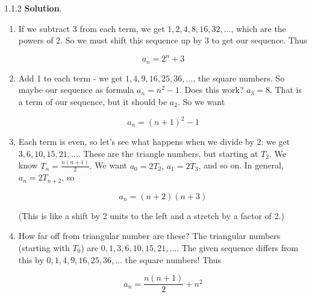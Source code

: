 \documentclass[11pt,]{book}
\theoremstyle{ptxplainnotitle}
\theoremstyle{ptxplaintitle}
\theoremstyle{ptxdefinitionnotitle}
\theoremstyle{ptxdefinitiontitle}
\theoremstyle{ptxdefinitionnotitle}
\theoremstyle{ptxdefinitiontitle}
\theoremstyle{ptxdefinitionnotitle}
\theoremstyle{ptxdefinitiontitle}
\theoremstyle{ptxdefinitiontitlenonumber}
\theoremstyle{ptxdefinitiontitlenonumber}
\numberwithin{equation}{chapter}
\begin{document}
\begin{divisionexercise}{1.1.2}
\textbf{Solution}.\quad%
\hypertarget{p-111}{}%
\leavevmode%
\begin{enumerate}[label=\alph*.]
\item\hypertarget{li-78}{}\hypertarget{p-112}{}%
If we subtract 3 from each term, we get \(1, 2, 4, 8, 16, 32, \ldots\text{,}\) which are the powers of 2. So we must shift this sequence up by 3 to get our sequence. Thus%
\par
\hypertarget{p-113}{}%
%
\begin{equation*}
a_n = 2^n + 3
\end{equation*}
%
\item\hypertarget{li-79}{}\hypertarget{p-114}{}%
Add 1 to each term - we get \(1, 4, 9, 16, 25, 36, \ldots\text{,}\) the square numbers. So maybe our sequence as formula \(a_n = n^2 - 1\text{.}\) Does this work? \(a_3 = 8\text{.}\) That is a term of our sequence, but it should be \(a_2\text{.}\) So we want%
\par
\hypertarget{p-115}{}%
%
\begin{equation*}
a_n = (n+1)^2 - 1
\end{equation*}
%
\item\hypertarget{li-80}{}\hypertarget{p-116}{}%
Each term is even, so let's see what happens when we divide by 2: we get \(3, 6, 10, 15, 21,\ldots\text{.}\) These are the triangle numbers, but starting at \(T_2\text{.}\) We know \(T_n = \frac{n(n+1)}{2}\text{.}\) We want \(a_0 = 2T_2\text{,}\) \(a_1 = 2T_3\text{,}\) and so on. In general, \(a_n = 2T_{n+2}\text{,}\) so%
\par
\hypertarget{p-117}{}%
%
\begin{equation*}
a_n = (n+2)(n+3)
\end{equation*}
%
\par
\hypertarget{p-118}{}%
(This is like a shift by 2 units to the left and a stretch by a factor of 2.)%
\item\hypertarget{li-81}{}\hypertarget{p-119}{}%
How far off from triangular number are these? The triangular numbers (starting with \(T_0\)) are \(0, 1, 3, 6, 10, 15, 21, \ldots\text{.}\) The given sequence differs from this by \(0, 1, 4, 9, 16, 25, 36, \ldots\) the square numbers! Thus%
\par
\hypertarget{p-120}{}%
%
\begin{equation*}
a_n = \frac{n(n+1)}{2} + n^2
\end{equation*}
%
\end{enumerate}
%
\end{divisionexercise}%
\end{document}
